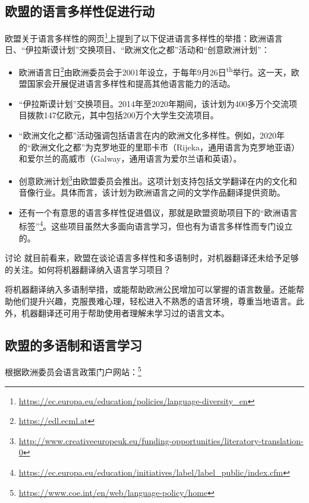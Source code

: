 \documentclass[output=paper]{langscibook}
\begin{document}
\subsection{‌欧盟的语言多样性促进行动}
欧盟关于语言多样性的网页\footnote{\url{https://ec.europa.eu/education/policies/language-diversity_en}}上提到了以下促进语言多样性的举措：欧洲语言日、“伊拉斯谟计划”交换项目、“欧洲文化之都”活动和“创意欧洲计划”：

\begin{itemize}
\item 欧洲语言日\footnote{\url{https://edl.ecml.at}}由欧洲委员会于2001年设立，于每年9月26日\textsuperscript{th}举行。‌这一天，欧盟国家会开展促进语言多样性和提高其他语言能力的活动。
\item “伊拉斯谟计划”交换项目。‌2014年至2020年期间，该计划为400多万个交流项目拨款147亿欧元，其中包括200万个大学生交流项目。
\item “欧洲文化之都”活动强调包括语言在内的欧洲文化多样性。‌例如，2020年的“欧洲文化之都”为克罗地亚的里耶卡市（Rijeka，通用语言为克罗地亚语）和爱尔兰的高威市（Galway，通用语言为爱尔兰语和英语）。
\item ‌创意欧洲计划\footnote{\url{http://www.creativeeuropeuk.eu/funding-opportunities/literatory-translation-0}}由欧盟委员会推出。这项计划支持包括文学翻译在内的文化和音像行业。‌具体而言，该计划为欧洲语言之间的文学作品翻译提供资助。
\item ‌还有一个有意思的语言多样性促进倡议，那就是欧盟资助项目下的“欧洲语言标签”\footnote{\url{https://ec.europa.eu/education/initiatives/label/label_public/index.cfm}}。这些项目虽然大多面向语言学习，但也有为语言多样性而专门设立的。
\end{itemize}

\begin{tblsframed}{讨论}
就目前看来，欧盟在谈论语言多样性和多语制时，对机器翻译还未给予足够的关注。如何将机器翻译纳入语言学习项目？
\end{tblsframed}

将机器翻译纳入多语制举措，或能帮助欧洲公民增加可以掌握的语言数量。还能帮助他们提升兴趣，克服畏难心理，轻松进入不熟悉的语言环境，尊重当地语言。‌此外，机器翻译还可用于帮助使用者理解未学习过的语言文本。


\subsection{欧盟的多语制和语言学习}
根据欧洲委员会语言政策门户网站：\footnote{\url{https://www.coe.int/en/web/language-policy/home}}
\end{document}
